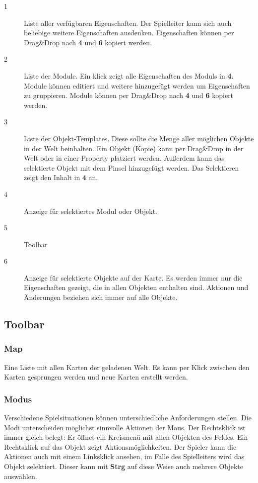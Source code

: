 \documentclass[german,10pt,a4paper,twocolumn,colorscheme=darkblue]{orarticle}
\begin{document}
		\begin{description}
			\item[1] Liste aller verfügbaren Eigenschaften. Der Spielleiter kann sich auch beliebige weitere Eigenschaften ausdenken. Eigenschaften können per Drag\&Drop nach \textbf{4} und \textbf{6} kopiert werden.
			\item[2] Liste der Module. Ein klick zeigt alle Eigenschaften des Moduls in \textbf{4}. Module können editiert und weitere hinzugefügt werden um Eigenschaften zu gruppieren. Module können per Drag\&Drop nach \textbf{4} und \textbf{6} kopiert werden.
			\item[3] Liste der Objekt-Templates. Diese sollte die Menge aller möglichen Objekte in der Welt beinhalten. Ein Objekt (Kopie) kann per Drag\&Drop in der Welt oder in einer Property platziert werden. Außerdem kann das selektierte Objekt mit dem Pinsel hinzugefügt werden. Das Selektieren zeigt den Inhalt in \textbf{4} an.
			\item[4] Anzeige für selektiertes Modul oder Objekt.
			\item[5] Toolbar
			\item[6] Anzeige für selektierte Objekte auf der Karte. Es werden immer nur die Eigenschaften gezeigt, die in allen Objekten enthalten sind. Aktionen und Änderungen beziehen sich immer auf alle Objekte.
		\end{description}
		
		\subsection{Toolbar}
		\vspace{-12pt}\subsubsection*{Map}
			Eine Liste mit allen Karten der geladenen Welt. Es kann per Klick zwischen den Karten gesprungen werden und neue Karten erstellt werden.
		\subsubsection*{Modus}
			Verschiedene Spielsituationen können unterschiedliche Anforderungen stellen. Die Modi unterscheiden möglichst sinnvolle Aktionen der Maus. Der Rechtsklick ist immer gleich belegt: Er öffnet ein Kreismenü mit allen Objekten des Feldes. Ein Rechtsklick auf das Objekt zeigt Aktionsmöglichkeiten. Der Spieler kann die Aktionen auch mit einem Linksklick ansehen, im Falle des Spielleiters wird das Objekt selektiert. Dieser kann mit \textbf{Strg} auf diese Weise auch mehrere Objekte auswählen.
			
\end{document}
